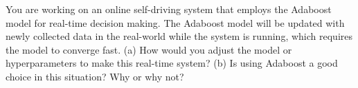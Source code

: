 You are working on an online self-driving system that employs the Adaboost model for real-time decision making. The Adaboost model will be updated with newly collected data in the real-world while the system is running, which requires the model to converge fast. (a) How would you adjust the model or hyperparameters to make this real-time system? (b) Is using Adaboost a good choice in this situation? Why or why not?
